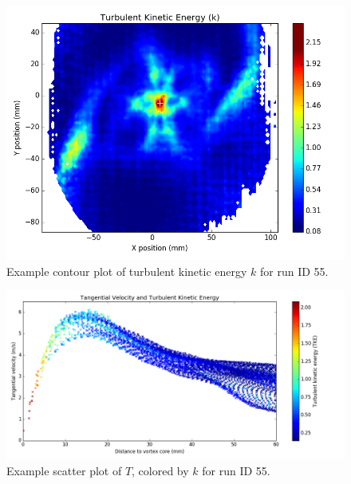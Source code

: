 \begin{figure}[H]
	\centering
	\includegraphics[width=5in]{figs/example_vortex_figs/example_ctke_contour}
\caption{Example contour plot of turbulent kinetic energy $k$ for run ID 55.}
\label{fig:examp_tke}
\end{figure}

\begin{figure}[H]
	\centering
	\includegraphics[width=7in]{figs/example_vortex_figs/example_TscatterTKE}
\caption{Example scatter plot of $T$, colored by $k$ for run ID 55.}
\label{fig:examp_Tscatter}
\end{figure}
